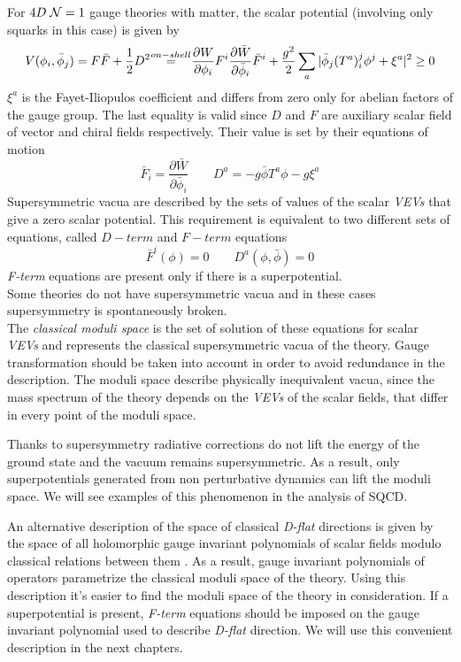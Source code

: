 For $4D \; \mathcal{N}=1$ gauge theories with matter, the scalar potential (involving only squarks in this case) is given by
\begin{equation}
 V ( \phi_i, \bar{\phi}_j) = F \bar{F} + \frac{1}{2} D^2  \quad \overset{\mathclap{on-shell}}=   \quad \frac{\partial W}{\partial \phi_i} F^i \frac{\partial \bar{W}} {\partial \bar{\phi}_i} \bar{F}^i + \frac{g^2}{2} \sum_a | \bar{\phi}_j (T^a)^j_i \phi^j + \xi^a | ^2  \geq 0
\end{equation} 
$\xi^a$ is the Fayet-Iliopulos coefficient and differs from zero only for abelian factors of the gauge group.
The last equality is valid since $D$ and $F$ are auxiliary scalar field of vector and chiral fields respectively.
Their value is set by their equations of motion
\begin{equation}
 \bar{F}_i  = \frac{\partial \bar{W}} {\partial \bar{\phi}_i} \qquad D^a = - g \bar{\phi} T^a \phi - g \xi^a 
\end{equation}
Supersymmetric vacua are described by the sets of values of the scalar \emph{VEVs} that give a zero scalar potential. 
This requirement is equivalent to two different sets of equations, called $D-term$ and $F-term $ equations
\begin{equation}
\bar{F}^i ( \phi) = 0 \qquad D^a (\phi , \bar{\phi}) = 0
\end{equation}
\emph{F-term} equations are present only if there is a superpotential.\\
Some theories do not have supersymmetric vacua and in these cases supersymmetry is spontaneously broken. \\
The \emph{classical moduli space} is the set of solution of these equations for scalar \emph{VEVs} and represents the classical supersymmetric vacua of the theory. 
Gauge transformation should be taken into account in order to avoid redundance in the description.
The moduli space describe physically inequivalent vacua, since the mass spectrum of the theory depends on the \emph{VEVs} of the scalar fields, that differ in every point of the moduli space. 

Thanks to supersymmetry radiative corrections do not lift the energy of the ground state and the vacuum remains supersymmetric.
As a result, only superpotentials generated from non perturbative dynamics can lift the moduli space. 
We will see examples of this phenomenon in the analysis of SQCD.

An alternative description of the space of classical \emph{D-flat} directions is given by the space of all holomorphic gauge invariant polynomials of scalar fields modulo classical relations between them \cite{Luty:1995sd}.
As a result, gauge invariant polynomials of operators parametrize the classical moduli space of the theory. 
Using this description it's easier to find the moduli space of the theory in consideration.
If a superpotential is present, \emph{F-term} equations should be imposed on the gauge invariant polynomial used to describe \emph{D-flat} direction.
We will use this convenient description in the next chapters.












